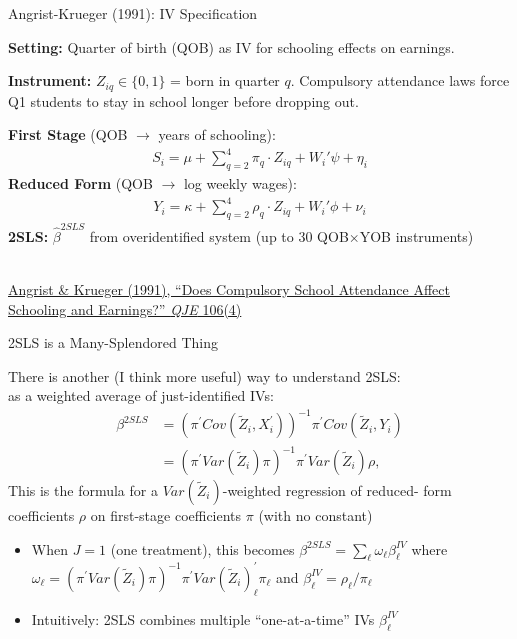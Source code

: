 \documentclass{beamer}
\begin{document}
\begin{frame}{Angrist-Krueger (1991): IV Specification}
{\small
\textbf{Setting:} Quarter of birth (QOB) as IV for schooling effects on earnings.\smallskip

\textbf{Instrument:} $Z_{iq} \in \{0,1\}$ = born in quarter $q$. Compulsory attendance laws force Q1 students to stay in school longer before dropping out.\smallskip

\textbf{First Stage} (QOB $\to$ years of schooling):
\vspace{-0.4cm}
\begin{align*}
S_i = \mu + \sum_{q=2}^{4} \pi_q \cdot Z_{iq} + W_i'\psi + \eta_i
\end{align*}
\vspace{-0.6cm}
\textbf{Reduced Form} (QOB $\to$ log weekly wages):
\vspace{-0.4cm}
\begin{align*}
Y_i = \kappa + \sum_{q=2}^{4} \rho_q \cdot Z_{iq} + W_i'\phi + \nu_i
\end{align*}
\vspace{-0.6cm}
\textbf{2SLS:} $\hat{\beta}^{2SLS}$ from overidentified system (up to 30 QOB$\times$YOB instruments)
}\\[0.1em]
{\scriptsize \textcolor{asher}{\href{https://academic.oup.com/qje/article/106/4/979/1917545}{Angrist \& Krueger (1991), ``Does Compulsory School Attendance Affect Schooling and Earnings?'' \emph{QJE} 106(4)}}}
\end{frame}

\begin{frame}{2SLS is a Many-Splendored Thing}

There is another (I think more useful) way to understand 2SLS: \\ as a weighted average of just-identified IVs:
\begin{align*}
\beta^{2SLS}&=\left(\pi^\prime Cov(\tilde{Z}_i,X_i^\prime)\right)^{-1} \pi^\prime Cov(\tilde{Z}_i,Y_i)\\
&=(\pi^\prime Var(\tilde{Z}_i)\pi)^{-1}\pi^\prime Var(\tilde{Z}_i)\rho,
\end{align*}
This is the formula for a $Var(\tilde{Z}_i)$-weighted regression of reduced- form coefficients $\rho$ on first-stage coefficients $\pi$ (with no constant)\pause{}
\begin{itemize}
\item When $J=1$ (one treatment), this becomes $\beta^{2SLS}=\sum_\ell \omega_\ell \beta_\ell^{IV}$ where $\omega_\ell=(\pi^\prime Var(\tilde{Z}_i)\pi)^{-1}\pi^\prime Var(\tilde{Z}_i)^\prime_\ell\pi_\ell$ and $\beta^{IV}_\ell = \rho_\ell/\pi_\ell$
\item Intuitively: 2SLS combines multiple ``one-at-a-time'' IVs $\beta_\ell^{IV}$
\end{itemize}

\end{frame}
\end{document}
